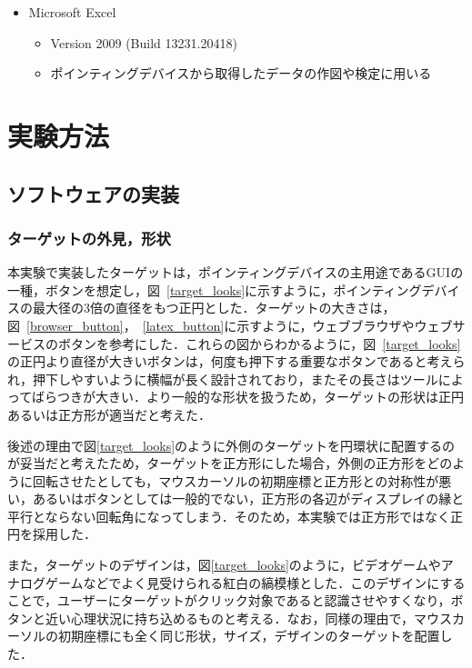 \documentclass[a4paper, papersize, titlepage]{jsarticle}
\begin{document}
\begin{multicols}{2}
\begin{itemize}
\item Microsoft Excel
\begin{itemize}
\item Version 2009 (Build 13231.20418)
\item ポインティングデバイスから取得したデータの作図や検定に用いる
\end{itemize}
\end{itemize}



\section{実験方法}

\subsection{ソフトウェアの実装}

\subsubsection{ターゲットの外見，形状}
本実験で実装したターゲットは，ポインティングデバイスの主用途であるGUIの一種，ボタンを想定し，図~\ref{target_looks}に示すように，ポインティングデバイスの最大径の3倍の直径をもつ正円とした．ターゲットの大きさは，図~\ref{browser_button}，~\ref{latex_button}に示すように，ウェブブラウザやウェブサービスのボタンを参考にした．これらの図からわかるように，図~\ref{target_looks}の正円より直径が大きいボタンは，何度も押下する重要なボタンであると考えられ，押下しやすいように横幅が長く設計されており，またその長さはツールによってばらつきが大きい．より一般的な形状を扱うため，ターゲットの形状は正円あるいは正方形が適当だと考えた．

後述の理由で図\ref{target_looks}のように外側のターゲットを円環状に配置するのが妥当だと考えたため，ターゲットを正方形にした場合，外側の正方形をどのように回転させたとしても，マウスカーソルの初期座標と正方形との対称性が悪い，あるいはボタンとしては一般的でない，正方形の各辺がディスプレイの縁と平行とならない回転角になってしまう．そのため，本実験では正方形ではなく正円を採用した．

また，ターゲットのデザインは，図\ref{target_looks}のように，ビデオゲームやアナログゲームなどでよく見受けられる紅白の縞模様とした．このデザインにすることで，ユーザーにターゲットがクリック対象であると認識させやすくなり，ボタンと近い心理状況に持ち込めるものと考える．なお，同様の理由で，マウスカーソルの初期座標にも全く同じ形状，サイズ，デザインのターゲットを配置した．


\end{multicols}
\end{document}
